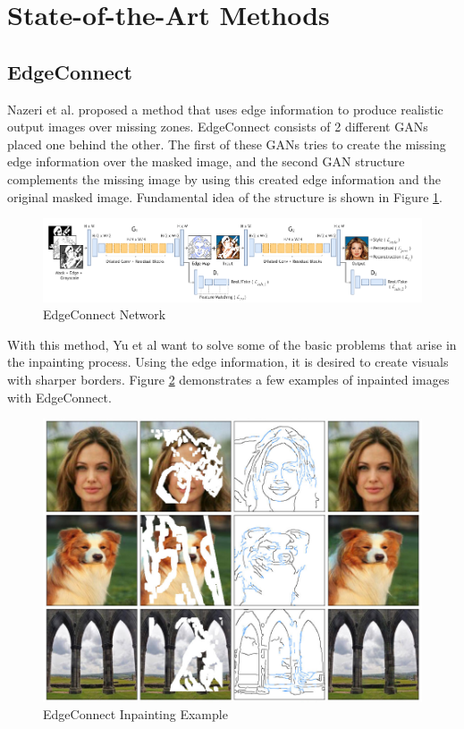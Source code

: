 \newpage
\section{State-of-the-Art Methods}

\subsection{EdgeConnect}

Nazeri et al. proposed a method \cite{edgeconnect} that uses edge information to produce realistic output images over missing zones.  EdgeConnect consists of 2 different GANs placed one behind the other. The first of these GANs tries to create the missing edge information over the masked image, and the second GAN structure complements the missing image by using this created edge information and the original masked image. Fundamental idea of the structure is shown in Figure \ref{fig:edgeconnect-network}.

\begin{figure}[h]
    \centering
    \includegraphics[scale=0.6]{figures/chapter4/EdgeConnect.PNG}
    \caption{EdgeConnect Network}
    \label{fig:edgeconnect-network}
\end{figure}

With this method, Yu et al want to solve some of the basic problems that arise in the inpainting process. Using the edge information, it is desired to create visuals with sharper borders. Figure \ref{fig:edgeconnect-example} demonstrates a few examples of inpainted images with EdgeConnect.

\begin{figure}[h]
    \centering
    \includegraphics[scale=0.85]{figures/chapter4/ExampleEdgeConnect.PNG}
    \caption{EdgeConnect Inpainting Example}
    \label{fig:edgeconnect-example}
\end{figure}

